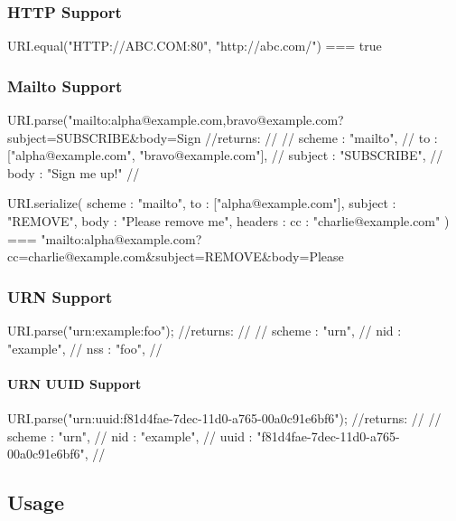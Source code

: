 \subsubsection*{H\+T\+TP Support}

\begin{DoxyVerb}URI.equal("HTTP://ABC.COM:80", "http://abc.com/") === true
\end{DoxyVerb}


\subsubsection*{Mailto Support}

\begin{DoxyVerb}URI.parse("mailto:alpha@example.com,bravo@example.com?subject=SUBSCRIBE&body=Sign%
//returns:
//{
//  scheme : "mailto",
//  to : ["alpha@example.com", "bravo@example.com"],
//  subject : "SUBSCRIBE",
//  body : "Sign me up!"
//}

URI.serialize({
    scheme : "mailto",
    to : ["alpha@example.com"],
    subject : "REMOVE",
    body : "Please remove me",
    headers : {
        cc : "charlie@example.com"
    }
}) === "mailto:alpha@example.com?cc=charlie@example.com&subject=REMOVE&body=Please%
\end{DoxyVerb}


\subsubsection*{U\+RN Support}

\begin{DoxyVerb}URI.parse("urn:example:foo");
//returns:
//{
//  scheme : "urn",
//  nid : "example",
//  nss : "foo",
//}
\end{DoxyVerb}


\paragraph*{U\+RN U\+U\+ID Support}

\begin{DoxyVerb}URI.parse("urn:uuid:f81d4fae-7dec-11d0-a765-00a0c91e6bf6");
//returns:
//{
//  scheme : "urn",
//  nid : "example",
//  uuid : "f81d4fae-7dec-11d0-a765-00a0c91e6bf6",
//}
\end{DoxyVerb}


\subsection*{Usage}

